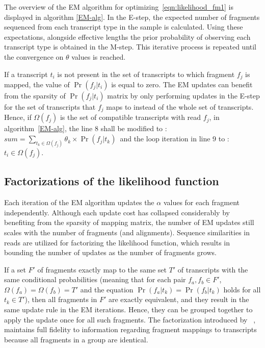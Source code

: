 The overview of the EM algorithm for optimizing~\cref{eqn:likelihood_fm1} is 
displayed in algorithm \ref{EM-alg}. In the E-step, the expected number of 
fragments sequenced from each transcript type in the sample is calculated. 
Using these expectations, alongside effective lengths the prior probability of 
observing each transcript type is obtained in the M-step. This iterative process 
is repeated until the convergence on $\theta$ values is reached. 

If a transcript $t_i$ is not present in the set of transcripts to which 
fragment $f_j$ is mapped, the  value of $\Pr{(f_j|t_i)}$ is equal to zero. 
The EM updates can benefit from the sparsity of $\Pr{(f_j|t_i)}$ matrix by 
only performing updates in the E-step for the set of transcripts that $f_j$ maps 
to instead of the whole set of transcripts. Hence, if $\Omega{(f_j)}$ is the set 
of compatible transcripts with read $f_j$, in algorithm~\ref{EM-alg}, the line 8 
shall be modified to : 
$sum = \sum_{t_k \in \Omega{(f_j)}}{\theta_k \times  \Pr{(f_j|t_k)}}$\  
and the loop iteration in line 9 to :   $t_i \in \Omega{(f_j)}$.

\subsection{Factorizations of the likelihood function}\label{int:fact}

Each iteration of the EM algorithm updates the $\alpha$ values for each fragment 
independently. Although each update cost has collapsed considerably by benefiting 
from the sparsity of mapping matrix, the number of EM updates still scales with 
the number of fragments (and alignments). Sequence similarities in reads are 
utilized for factorizing the likelihood function, which results in bounding the 
number of updates as the number of fragments grows.
 
If a set $F'$ of fragments exactly map to the same set $T'$ of transcripts 
with the same conditional probabilities (meaning that for each pair 
$f_a,f_b \in F'$, $\Omega{(f_a)}=\Omega{(f_b)}=T'$ and the equation 
$\Pr{(f_a|t_k)}=\Pr{(f_b|t_k)}$ holds for all $t_k \in T'$), then all 
fragments in $F'$ are exactly equivalent, and they result in the same update rule 
in the EM iterations. Hence, they can be grouped together to apply the update once 
for all such fragments. The factorization introduced by 
\isoem~\citep{isoem}, maintains full fidelity to information regarding fragment 
mappings to transcripts because all fragments in a group are identical.

